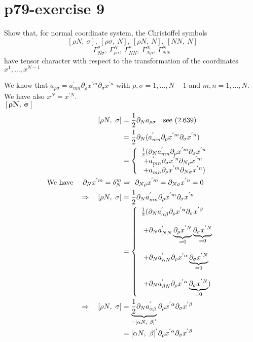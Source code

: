 \section{p79-exercise 9}
\begin{tcolorbox}
Show that, for normal coordinate system, the Christoffel symbols $$ \ [ \rho N, \  \sigma], \ [\rho \sigma, \ N  ], \ [\rho N, \ N], \ [N N, \  N]$$
$$\Gamma^{\rho}_{N \sigma},\ \Gamma^{N}_{\rho \sigma},\ \Gamma^{\rho}_{N N}, \ \Gamma^{N}_{N \rho}, \ \Gamma^{N}_{N N}$$ have tensor character with respect to the transformation of the coordinates $x^1, \dots , x^{N-1}$
\end{tcolorbox}
We know that $a_{\rho \sigma} = a^{'}_{mn}\partial_{\rho}x^{'m}\partial_{\sigma}x^{'n}$ with $\rho , \sigma = 1, \dots, N-1$ and $m , n = 1, \dots, N$. We have also $x^N = x^{'N}$.\\
$\boldsymbol{[ \rho N, \  \sigma]}$
\begin{align}
\ [ \rho N, \  \sigma] &= \half \partial_N a_{\rho \sigma}\quad \text{see (2.639)}\\
\ &= \half \partial_N (a^{'}_{mn}\partial_{\rho}x^{'m}\partial_{\sigma}x^{'n})\\
\ & = \left\{ \begin{array}{l}
\half (\partial_N a^{'}_{mn}\partial_{\rho}x^{'m}\partial_{\sigma}x^{'n}\\
\ + a^{'}_{mn} \partial_{\sigma}x^{'n} \partial_{N \rho}x^{'m}\\
\ + a^{'}_{mn} \partial_{\rho}x^{'m} \partial_{N \sigma}x^{'n})
\end{array} \right.\\
\text{We have  }\quad \partial_{N }x^{'m} = \delta^m_N & \Rightarrow \ \partial_{N \rho}x^{'m}= \partial_{N \sigma}x^{'n} = 0\\
\Rightarrow \quad [ \rho N, \  \sigma] &= \half \partial_N a^{'}_{mn}\partial_{\rho}x^{'m}\partial_{\sigma}x^{'n}\\
\ &= \left\{ \begin{array}{l}
\half (\partial_N a^{'}_{\alpha\beta}\partial_{\rho}x^{'\alpha}\partial_{\sigma}x^{'\beta}\\\\
\ +\partial_N a^{'}_{NN}\underbrace{\partial_{\rho}x^{'N}}_{=0}\underbrace{\partial_{\sigma}x^{'N}}_{=0}\\\\
\ +\partial_N a^{'}_{\alpha N}\partial_{\rho}x^{'\alpha}\underbrace{\partial_{\sigma}x^{'N}}_{=0}\\\\
\ +\partial_N a^{'}_{\beta N}\partial_{\rho}x^{'\alpha}\underbrace{\partial_{\sigma}x^{'N}}_{=0})\\
\end{array} \right.\\
\Rightarrow \quad [ \rho N, \  \sigma] &=  \underbrace{\half \partial_N a^{'}_{\alpha\beta}}_{= [\alpha N, \ \beta]^{'}}\partial_{\rho}x^{'\alpha}\partial_{\sigma}x^{'\beta}\\
&= [\alpha N, \ \beta]^{'}\partial_{\rho}x^{'\alpha}\partial_{\sigma}x^{'\beta}
\end{align}
